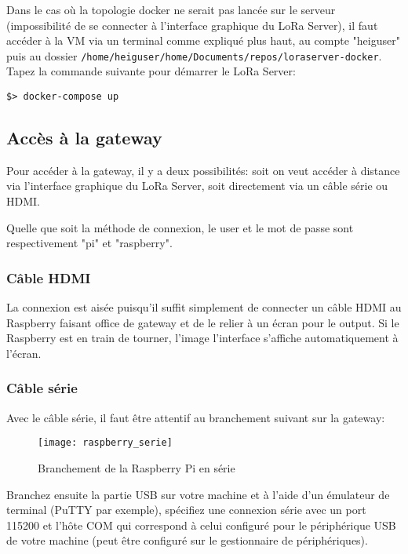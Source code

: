 Dans le cas où la topologie docker ne serait pas lancée sur le serveur (impossibilité de se connecter à l'interface graphique du LoRa Server), il faut accéder à la VM via un terminal comme expliqué plus haut, au compte "heiguser" puis au dossier \texttt{/home/heiguser/home/Documents/repos/loraserver-docker}. Tapez la commande suivante pour démarrer le LoRa Server:

\texttt{\$> docker-compose up}

\subsection{Accès à la gateway}

Pour accéder à la gateway, il y a deux possibilités: soit on veut accéder à distance via l'interface graphique du LoRa Server, soit directement via un câble série ou HDMI.

Quelle que soit la méthode de connexion, le user et le mot de passe sont respectivement "pi" et "raspberry".

\subsubsection{Câble HDMI}

La connexion est aisée puisqu'il suffit simplement de connecter un câble HDMI au Raspberry faisant office de gateway et de le relier à un écran pour le output. Si le Raspberry est en train de tourner, l'image l'interface s'affiche automatiquement à l'écran.

\subsubsection{Câble série}

Avec le câble série, il faut être attentif au branchement suivant sur la gateway: 

\vspace{2mm}
\begin{figure}[h!]
\centering
\texttt{[image: raspberry\_serie]}
\caption{Branchement de la Raspberry Pi en série}
\end{figure}

Branchez ensuite la partie USB sur votre machine et à l'aide d'un émulateur de terminal (PuTTY par exemple), spécifiez une connexion série avec un port 115200 et l'hôte COM qui correspond à celui configuré pour le périphérique USB de votre machine (peut être configuré sur le gestionnaire de périphériques).

